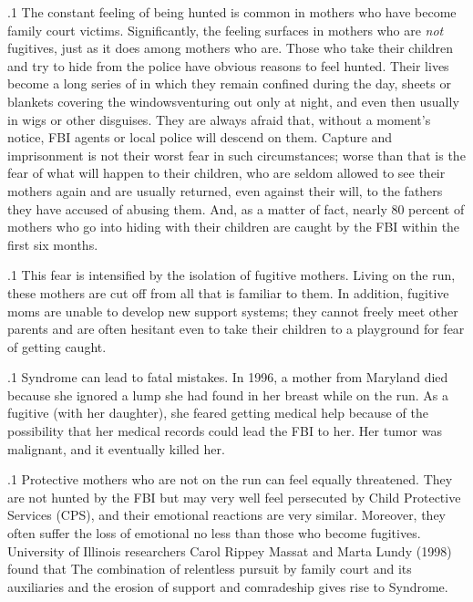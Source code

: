 \documentclass[11pt, twoside]{article}
\begin{document}
{\p.1{%
\noindent{}The constant feeling of being hunted is common in mothers who have
become family court victims. Significantly, the feeling surfaces in mothers who are \textit{not} fugitives, just as it does among mothers who are.
Those who take their children and try to hide from the police have
obvious reasons to feel hunted. Their lives become a long series of  in which they remain confined during the day, sheets or blankets covering the windows\mdash{}venturing out only at night, and even then
usually in wigs or other disguises. They are always afraid that, without a
moment’s notice, FBI agents or local police will descend on them. Capture and imprisonment is not their worst fear in such circumstances;
worse than that is the fear of what will happen to their children, who
are seldom allowed to see their mothers again and are usually returned,
even against their will, to the fathers they have accused of abusing them.
And, as a matter of fact, nearly 80 percent of mothers who go into
hiding with their children are caught by the FBI within the first six
months.
}%

\p.1{%
This fear is intensified by the isolation of fugitive mothers. Living on
the run, these mothers are cut off from all that is familiar to them. In addition, fugitive moms are unable to develop new support systems; they
cannot freely meet other parents and are often hesitant even to take their
children to a playground for fear of getting caught.
}%

\p.1{%
 Syndrome can lead to fatal mistakes. In 1996, a mother from
Maryland died because she ignored a lump she had found in her breast
while on the run. As a fugitive (with her daughter), she feared getting
medical help because of the possibility that her medical records could
lead the FBI to her. Her tumor was malignant, and it eventually killed
her.
}%

\p.1{%
Protective mothers who are not on the run can feel equally
threatened. They are not hunted by the FBI but may very well feel persecuted by Child Protective Services (CPS), and their emotional reactions
are very similar. Moreover, they often suffer the loss of emotional  no less than those who become fugitives. University of
Illinois researchers Carol Rippey Massat and Marta Lundy (1998) found that  The combination of relentless pursuit
by family court and its auxiliaries and the erosion of support and
comradeship gives rise to  Syndrome.
}%

}
\end{document}
